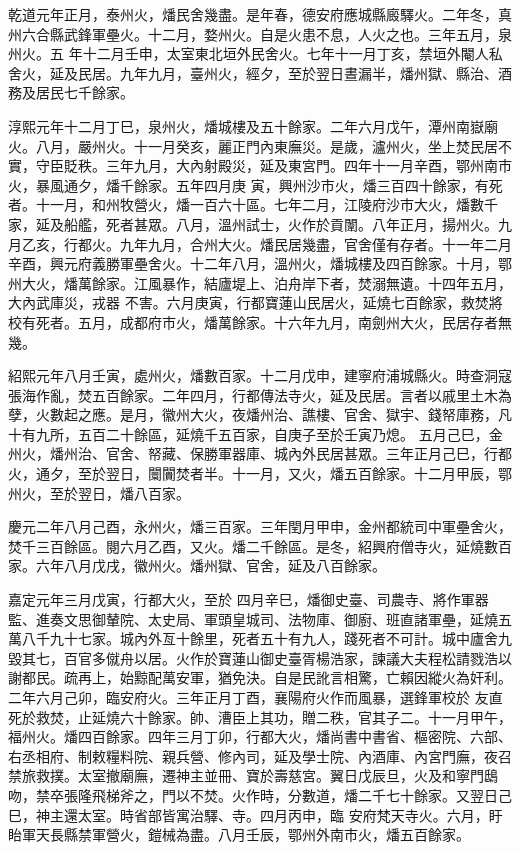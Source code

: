 \begin{pinyinscope}
 乾道元年正月，泰州火，燔民舍幾盡。是年春，德安府應城縣廄驛火。二年冬，真州六合縣武鋒軍壘火。十二月，婺州火。自是火患不息，人火之也。三年五月，泉州火。五
 年十二月壬申，太室東北垣外民舍火。七年十一月丁亥，禁垣外閹人私舍火，延及民居。九年九月，臺州火，經夕，至於翌日晝漏半，燔州獄、縣治、酒務及居民七千餘家。



 淳熙元年十二月丁巳，泉州火，燔城樓及五十餘家。二年六月戊午，潭州南嶽廟火。八月，嚴州火。十一月癸亥，麗正門內東廡災。是歲，瀘州火，坐上焚民居不實，守臣貶秩。三年九月，大內射殿災，延及東宮門。四年十一月辛酉，鄂州南市火，暴風通夕，燔千餘家。五年四月庚
 寅，興州沙市火，燔三百四十餘家，有死者。十一月，和州牧營火，燔一百六十區。七年二月，江陵府沙市大火，燔數千家，延及船艦，死者甚眾。八月，溫州試士，火作於貢闈。八年正月，揚州火。九月乙亥，行都火。九年九月，合州大火。燔民居幾盡，官舍僅有存者。十一年二月辛酉，興元府義勝軍壘舍火。十二年八月，溫州火，燔城樓及四百餘家。十月，鄂州大火，燔萬餘家。江風暴作，結廬堤上、泊舟岸下者，焚溺無遺。十四年五月，大內武庫災，戎器
 不害。六月庚寅，行都寶蓮山民居火，延燒七百餘家，救焚將校有死者。五月，成都府市火，燔萬餘家。十六年九月，南劍州大火，民居存者無幾。



 紹熙元年八月壬寅，處州火，燔數百家。十二月戊申，建寧府浦城縣火。時查洞寇張海作亂，焚五百餘家。二年四月，行都傳法寺火，延及民居。言者以戚里土木為孽，火數起之應。是月，徽州大火，夜燔州治、譙樓、官舍、獄宇、錢帑庫務，凡十有九所，五百二十餘區，延燒千五百家，自庚子至於壬寅乃熄。
 五月己巳，金州火，燔州治、官舍、帑藏、保勝軍器庫、城內外民居甚眾。三年正月己巳，行都火，通夕，至於翌日，闤闠焚者半。十一月，又火，燔五百餘家。十二月甲辰，鄂州火，至於翌日，燔八百家。



 慶元二年八月己酉，永州火，燔三百家。三年閏月甲申，金州都統司中軍壘舍火，焚千三百餘區。閱六月乙酉，又火。燔二千餘區。是冬，紹興府僧寺火，延燒數百家。六年八月戊戌，徽州火。燔州獄、官舍，延及八百餘家。



 嘉定元年三月戊寅，行都大火，至於
 四月辛巳，燔御史臺、司農寺、將作軍器監、進奏文思御輦院、太史局、軍頭皇城司、法物庫、御廚、班直諸軍壘，延燒五萬八千九十七家。城內外亙十餘里，死者五十有九人，踐死者不可計。城中廬舍九毀其七，百官多僦舟以居。火作於寶蓮山御史臺胥楊浩家，諫議大夫程松請戮浩以謝都民。疏再上，始黥配萬安軍，猶免決。自是民訛言相驚，亡賴因縱火為奸利。二年六月己卯，臨安府火。三年正月丁酉，襄陽府火作而風暴，選鋒軍校於
 友直死於救焚，止延燒六十餘家。帥、漕臣上其功，贈二秩，官其子二。十一月甲午，福州火。燔四百餘家。四年三月丁卯，行都大火，燔尚書中書省、樞密院、六部、右丞相府、制敕糧料院、親兵營、修內司，延及學士院、內酒庫、內宮門廡，夜召禁旅救撲。太室撤廟廡，遷神主並冊、寶於壽慈宮。翼日戊辰旦，火及和寧門鴟吻，禁卒張隆飛梯斧之，門以不焚。火作時，分數道，燔二千七十餘家。又翌日己巳，神主還太室。時省部皆寓治驛、寺。四月丙申，臨
 安府梵天寺火。六月，盱眙軍天長縣禁軍營火，鎧械為盡。八月壬辰，鄂州外南市火，燔五百餘家。




\end{pinyinscope}
